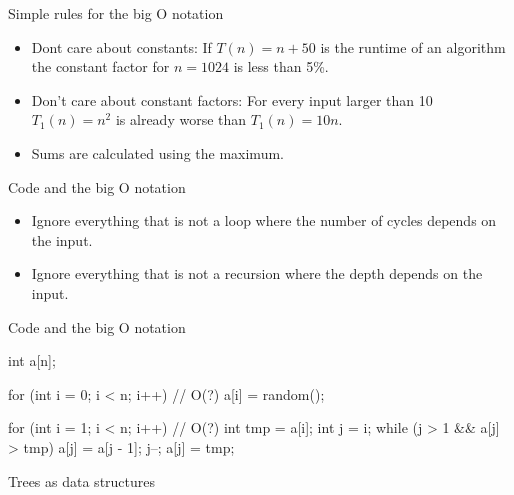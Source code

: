 \documentclass{beamer}
\begin{document}
\begin{frame}{Simple rules for the big O notation}
    \begin{itemize}
    
        \item Dont care about constants: If $T(n) = n + 50$ is the runtime of an algorithm
              the constant factor for $n = 1024$ is less than 5\%.
              
        \item Don't care about constant factors: For every input larger than 10 
              $T_1(n) = n^2$ is already worse than $T_1(n) = 10n$.
              
        \item Sums are calculated using the maximum.
    
    \end{itemize}
\end{frame}


\begin{frame}{Code and the big O notation}
    \begin{itemize}
    
        \item Ignore everything that is not a loop where the number of cycles depends
              on the input.
              
        \item Ignore everything that is not a recursion where the depth depends on 
              the input.
              
    \end{itemize}
\end{frame}


\begin{frame}[fragile]{Code and the big O notation}
\begin{cppcode}
int a[n];

for (int i = 0; i < n; i++)     // O(?)
    a[i] = random();

for (int i = 1; i < n; i++) {   // O(?)
    int tmp = a[i];
    int j = i;
    while (j > 1 && a[j] > tmp) {
        a[j] = a[j - 1];
        j--;
    }
    a[j] = tmp;
}
\end{cppcode}
\end{frame}


\begin{frame}
    \begin{center}
        \begin{LARGE}
            Trees as data structures
        \end{LARGE}
    \end{center}
\end{frame}
\end{document}
